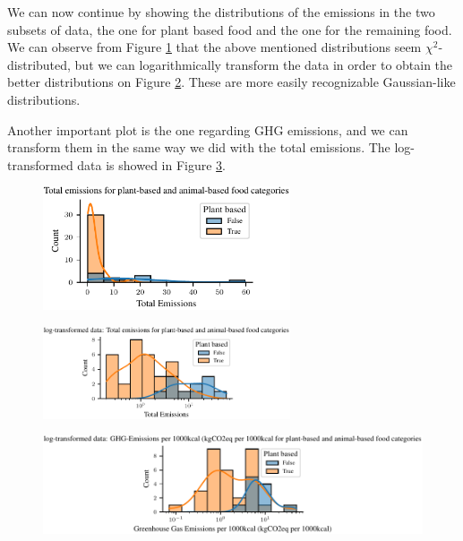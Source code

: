\documentclass{article}
\begin{document}
We can now continue by showing the distributions of the emissions in the two subsets of data, the one for plant based food and the one for the remaining food. We can observe from Figure \ref{fig:emissions} that the above mentioned distributions seem $\chi^2$-distributed, but we can logarithmically transform the data in order to obtain the better distributions on Figure \ref{fig:emissions-log}. These are more easily recognizable Gaussian-like distributions.

Another important plot is the one regarding GHG emissions, and we can transform them in the same way we did with the total emissions. The log-transformed data is showed in Figure \ref{fig:ghg-log}.

\begin{figure}[h]
  \centering
  \includegraphics[width=0.65\textwidth]{figures/emissions.pdf}
  \label{fig:emissions}
\end{figure}

\begin{figure}[h]
  \centering
  \includegraphics[width=0.65\textwidth]{figures/emissions-log.pdf}
  \label{fig:emissions-log}
\end{figure}

\begin{figure}[h]
    \centering
    \includegraphics{figures/ghg-log.pdf}
    \label{fig:ghg-log}
\end{figure}
\end{document}
